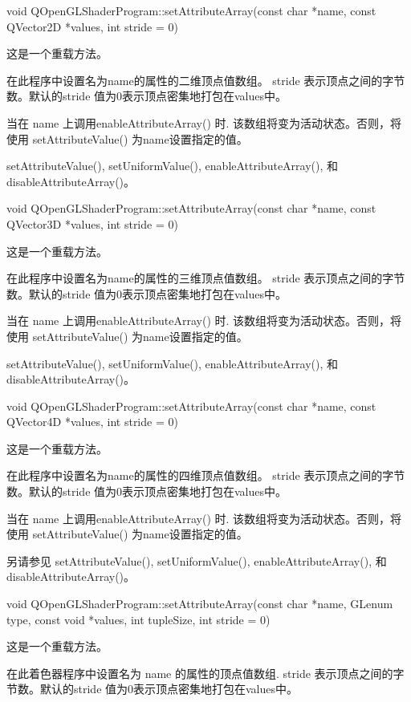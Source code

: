 void QOpenGLShaderProgram::setAttributeArray(const char *name, const QVector2D *values, int stride = 0)

这是一个重载方法。

在此程序中设置名为name的属性的二维顶点值数组。 stride 表示顶点之间的字节数。默认的stride 值为0表示顶点密集地打包在values中。

当在 name 上调用enableAttributeArray() 时. 该数组将变为活动状态。否则，将使用 setAttributeValue() 为name设置指定的值。


\begin{seeAlso}
setAttributeValue(), setUniformValue(), enableAttributeArray(), 和 disableAttributeArray()。
\end{seeAlso}

void QOpenGLShaderProgram::setAttributeArray(const char *name, const QVector3D *values, int stride = 0)

这是一个重载方法。

在此程序中设置名为name的属性的三维顶点值数组。 stride 表示顶点之间的字节数。默认的stride 值为0表示顶点密集地打包在values中。

当在 name 上调用enableAttributeArray() 时. 该数组将变为活动状态。否则，将使用 setAttributeValue() 为name设置指定的值。

\begin{seeAlso}
setAttributeValue(), setUniformValue(), enableAttributeArray(), 和 disableAttributeArray()。
\end{seeAlso}

void QOpenGLShaderProgram::setAttributeArray(const char *name, const QVector4D *values, int stride = 0)

这是一个重载方法。

在此程序中设置名为name的属性的四维顶点值数组。 stride 表示顶点之间的字节数。默认的stride 值为0表示顶点密集地打包在values中。

当在 name 上调用enableAttributeArray() 时. 该数组将变为活动状态。否则，将使用 setAttributeValue() 为name设置指定的值。

另请参见 setAttributeValue(), setUniformValue(), enableAttributeArray(), 和 disableAttributeArray()。

void QOpenGLShaderProgram::setAttributeArray(const char *name, GLenum type, const void *values, int tupleSize, int stride = 0)

这是一个重载方法。

在此着色器程序中设置名为 name 的属性的顶点值数组. stride 表示顶点之间的字节数。默认的stride 值为0表示顶点密集地打包在values中。

